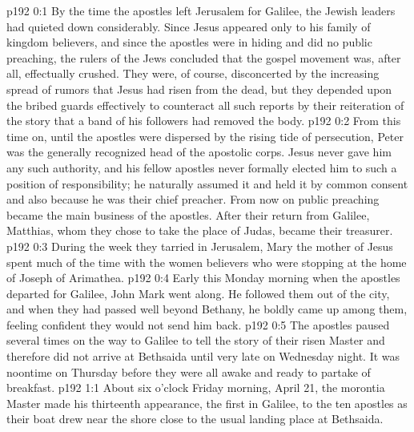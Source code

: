 \author{Midwayer Commission}
\vs p192 0:1 By the time the apostles left Jerusalem for Galilee, the Jewish leaders had quieted down considerably. Since Jesus appeared only to his family of kingdom believers, and since the apostles were in hiding and did no public preaching, the rulers of the Jews concluded that the gospel movement was, after all, effectually crushed. They were, of course, disconcerted by the increasing spread of rumors that Jesus had risen from the dead, but they depended upon the bribed guards effectively to counteract all such reports by their reiteration of the story that a band of his followers had removed the body.
\vs p192 0:2 From this time on, until the apostles were dispersed by the rising tide of persecution, Peter was the generally recognized head of the apostolic corps. Jesus never gave him any such authority, and his fellow apostles never formally elected him to such a position of responsibility; he naturally assumed it and held it by common consent and also because he was their chief preacher. From now on public preaching became the main business of the apostles. After their return from Galilee, Matthias, whom they chose to take the place of Judas, became their treasurer.
\vs p192 0:3 During the week they tarried in Jerusalem, Mary the mother of Jesus spent much of the time with the women believers who were stopping at the home of Joseph of Arimathea.
\vs p192 0:4 Early this Monday morning when the apostles departed for Galilee, John Mark went along. He followed them out of the city, and when they had passed well beyond Bethany, he boldly came up among them, feeling confident they would not send him back.
\vs p192 0:5 The apostles paused several times on the way to Galilee to tell the story of their risen Master and therefore did not arrive at Bethsaida until very late on Wednesday night. It was noontime on Thursday before they were all awake and ready to partake of breakfast.\plusone
{}
\vs p192 1:1 About six o’clock Friday morning, April 21, the morontia Master made his thirteenth appearance, the first in Galilee, to the ten apostles as their boat drew near the shore close to the usual landing place at Bethsaida.
